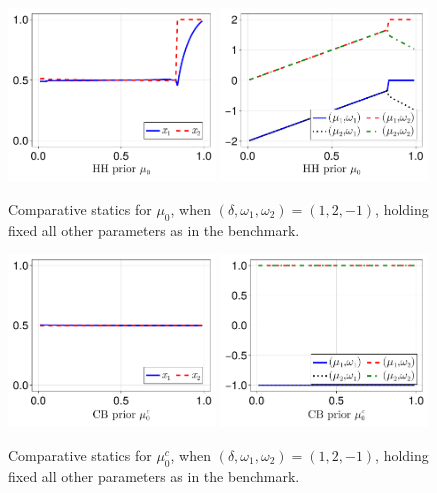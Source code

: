 \documentclass[12pt,a4paper]{article}
\begin{document}
\begin{figure}[H]
\centering
\includegraphics[width=0.49\textwidth]{figures/V8/γ_1/fig_optimal_π_across_μ_0_ω_1_2_ω_2_-1_δ_1.0_.pdf}
\includegraphics[width=0.49\textwidth]{figures/V8/γ_1/fig_posterior_across_μ_0_ω_1_2_ω_2_-1_δ_1.0_.pdf}
\caption{Comparative statics for $\mu_0$, when $(\delta,\omega_1,\omega_2)=(1,2,-1)$, holding fixed all other parameters as in the benchmark.}
\label{FigureA31}
\end{figure}

\begin{figure}[H]
\centering
\includegraphics[width=0.49\textwidth]{figures/V8/γ_1/fig_optimal_π_across_μ_0_c_ω_1_2_ω_2_-1_δ_1.0_.pdf}
\includegraphics[width=0.49\textwidth]{figures/V8/γ_1/fig_posterior_across_μ_0_c_ω_1_2_ω_2_-1_δ_1.0_.pdf}
\caption{Comparative statics for $\mu_0^c$, when $(\delta,\omega_1,\omega_2)=(1,2,-1)$, holding fixed all other parameters as in the benchmark.}
\label{FigureA32}
\end{figure}
\end{document}
